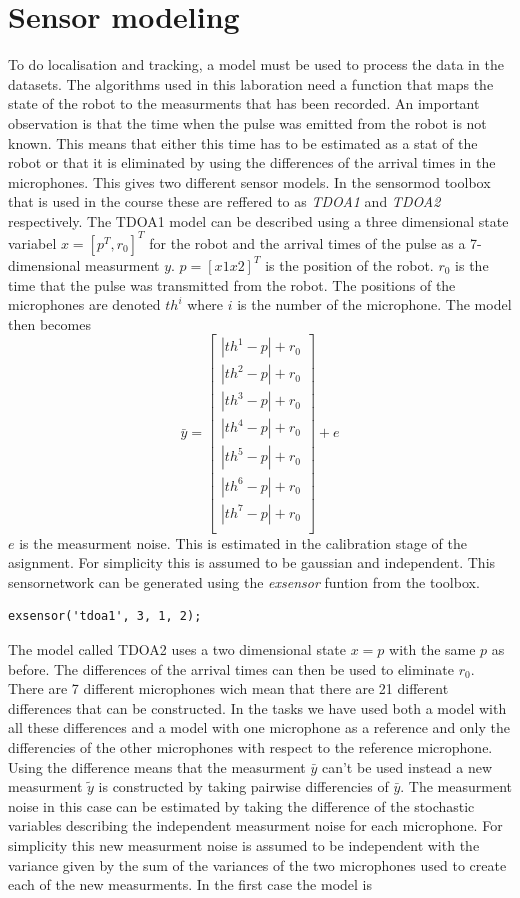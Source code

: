 \documentclass[10pt,a4paper]{report}
\begin{document}
\section{Sensor modeling}
\label{Sensor modeling}
To do localisation and tracking, a model must be used to process the data in the datasets.
The algorithms used in this laboration need a function that maps the state of the robot to the measurments that has been recorded.
An important observation is that the time when the pulse was emitted from the robot is not known.
This means that either this time has to be estimated as a stat of the robot or that it is eliminated by using the differences of the arrival times in the microphones.
This gives two different sensor models.
In the sensormod toolbox that is used in the course these are reffered to as \emph{TDOA1} and \emph{TDOA2} respectively.
The TDOA1 model can be described using a three dimensional state variabel $x = [p^T, r_0]^T$ 
for the robot and the arrival times of the pulse as a 7-dimensional measurment $y$.
$p = [x1 x2]^T$ is the position of the robot. $r_0$ is the time that the pulse was transmitted from the robot.
The positions of the microphones are denoted $th^i$ where $i$ is the number of the microphone.
The model then becomes
\[
  \bar{y} = 
  \begin{bmatrix}
    |th^1 - p| + r_0 \\ 
    |th^2 - p| + r_0 \\ 
    |th^3 - p| + r_0 \\ 
    |th^4 - p| + r_0 \\ 
    |th^5 - p| + r_0 \\ 
    |th^6 - p| + r_0 \\ 
    |th^7 - p| + r_0 \\ 
  \end{bmatrix} + e
\]
$e$ is the measurment noise. This is estimated in the calibration stage of the asignment.
For simplicity this is assumed to be gaussian and independent.
This sensornetwork can be generated using the \emph{exsensor} funtion from the toolbox.
\begin{verbatim}
exsensor('tdoa1', 3, 1, 2);
\end{verbatim}

The model called TDOA2 uses a two dimensional state $x = p$ with the same $p$ as before.
The differences of the arrival times can then be used to eliminate $r_0$.
There are 7 different microphones wich mean that there are 21 different differences that can be constructed.
In the tasks we have used both a model with all these differences and 
a model with one microphone as a reference and only the differencies of the other microphones with respect to the reference microphone.
Using the difference means that the measurment $\bar{y}$ can't be used instead a new measurment $\tilde{y}$ is constructed by taking pairwise differencies of $\bar{y}$.
The measurment noise in this case can be estimated by taking the difference of the stochastic variables describing the independent measurment noise for each microphone.
For simplicity this new measurment noise is assumed to be independent with the variance given by the sum of the variances of the two microphones used to create each of the new measurments.
In the first case the model is
\end{document}
